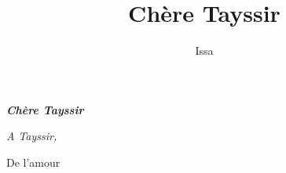 \documentclass[12pt]{book} %
\begin{document}
	
\pagestyle{plain} 
\author{{\Large Issa}}
\title{{\Huge Chère Tayssir}}
\date{}

\newpage
\mbox{}
\thispagestyle{empty}

\newpage
\mbox{}
\thispagestyle{empty}

\newpage
\mbox{}
\thispagestyle{empty}


\begin{center}
	\vspace*{5cm}
	\textit{\textbf{{\LARGE Chère Tayssir}}}
	
\end{center}
\newpage
\mbox{}
\thispagestyle{empty}

\maketitle

\newpage
\mbox{}
\thispagestyle{empty}

\newpage
\mbox{}
\thispagestyle{empty}
\vfill
\begin{flushright}
	\textit{A Tayssir,}
\end{flushright}
\vfill
\newpage
\mbox{}
\thispagestyle{empty}	
	
\newpage
\mbox{}
\thispagestyle{empty}

	
\setcounter{page}{9} 	
	
\thispagestyle{empty}
\vspace*{5cm}
\begin{center}
	{\LARGE De l'amour}
\end{center}
{}
\newpage
\mbox{}
\thispagestyle{empty}	
	


\newpage
\tableofcontents
	
\end{document}
